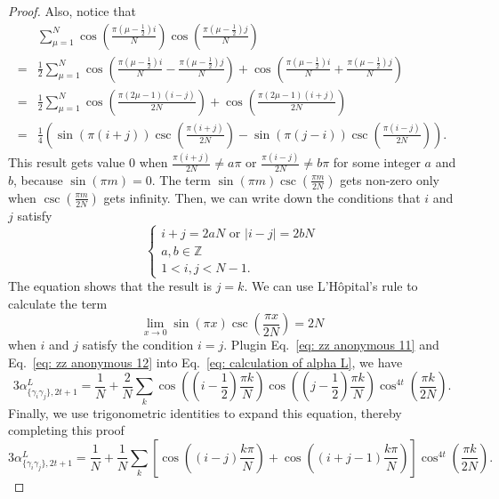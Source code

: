 \documentclass[showpacs,onecolumn,aps,prx,long bibliography,superscriptaddress,notitlepage]{revtex4-1}
\newcommand{\alpl}{\alpha_{\{\gamma_i\gamma_j\}, 2t+1}^{L}}
\begin{document}
\begin{proof}
Also, notice that
\begin{equation}
\label{eq: zz anonymous 12}
\begin{aligned}
& \sum_{\mu=1}^{N} \cos \left(\frac{\pi\left(\mu-\frac{1}{2}\right) i}{N}\right) \cos \left(\frac{\pi\left(\mu-\frac{1}{2}\right) j}{N}\right) \\
= & \frac{1}{2} \sum_{\mu=1}^{N} \cos \left(\frac{\pi\left(\mu-\frac{1}{2}\right) i}{N}-\frac{\pi\left(\mu-\frac{1}{2}\right) j}{N}\right)+\cos \left(\frac{\pi\left(\mu-\frac{1}{2}\right) i}{N}+\frac{\pi\left(\mu-\frac{1}{2}\right) j}{N}\right) \\
= & \frac{1}{2} \sum_{\mu=1}^{N} \cos \left(\frac{\pi(2 \mu-1)(i-j)}{2 N}\right)+\cos \left(\frac{\pi(2 \mu-1)(i+j)}{2 N}\right) \\
= & \frac{1}{4}\left(\sin (\pi(i+j)) \csc \left(\frac{\pi(i+j)}{2 N}\right)-\sin (\pi(j-i)) \csc \left(\frac{\pi(i-j)}{2 N}\right)\right).
\end{aligned}
\end{equation}
This result gets value $0$ when $\frac{\pi(i+j)}{2 N}\neq a \pi$ or $\frac{\pi(i-j)}{2 N}\neq b \pi$ for some integer $a$ and $b$, because $\sin(\pi m) = 0$. The term $ \sin(\pi m) \csc(\frac{\pi m}{2N})$ gets non-zero only when $\csc(\frac{\pi m}{2N})$ gets infinity. Then, we can write down the conditions that $i$ and $j$ satisfy
\begin{equation}
\left\{\begin{array}{l}
i+j=2 a N \text { or } |i-j|=2 b N \\
a, b \in \mathbb{Z} \\
1<i,j<N-1.
\end{array} \right.
\end{equation}
The equation shows that the result is $j=k$. We can use  L'Hôpital's rule to calculate the term
\begin{equation}
    \label{eq: zz anonymous 11}
    \lim_{x\to 0} \sin(\pi x) \csc(\frac{\pi x}{2N}) = 2N
\end{equation}
when $i$ and $j$ satisfy the condition $i=j$. Plugin Eq.~\eqref{eq: zz anonymous 11} and Eq.~\eqref{eq: zz anonymous 12} into Eq.~\eqref{eq: calculation of alpha L}, we have
\begin{equation}
    \label{eq: zz anonymous 13}
    3\alpl = \frac{1}{N} + \frac{2}{N} \sum_k \cos \left(\left(i-\frac{1}{2}\right) \frac{\pi k}{N}\right)\cos \left(\left(j-\frac{1}{2}\right) \frac{\pi k}{N}\right)\cos ^{4 t}\left( \frac{\pi k}{2 N} \right).
\end{equation}
Finally, we use trigonometric identities to expand this equation, thereby completing this proof
\begin{equation}
    3\alpl=\frac{1}{N}+\frac{1}{N} \sum_k\left[\cos \left((i-j) \frac{k \pi}{N}\right)+\cos \left((i+j-1) \frac{k \pi}{N}\right)\right] \cos ^{4 t}\left(\frac{\pi k}{2 N}\right).
\end{equation}
\end{proof}
\end{document}
